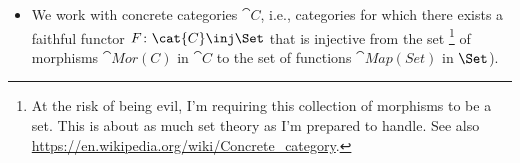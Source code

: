 \documentclass[onesided]{ccg-pset}
\author{Colton Grainger}
\date{\today}
\begin{document}
\maketitle

\begin{note}
    \label{conventions}
    \hfill
    \begin{itemize}
        \item We work with concrete categories $\cat{C}$, i.e., categories for which there exists a faithful functor $F \colon \cat{C} \inj \Set$ that is injective from the set%
            \footnote{%
                At the risk of being evil, I'm requiring this collection of morphisms to be a set. This is about as much set theory as I'm prepared to handle. See also \url{https://en.wikipedia.org/wiki/Concrete_category}.
            }
            of morphisms $\cat{Mor(C)}$ in $\cat{C}$ to the set of functions $\cat{Map(Set)}$ in $\Set$).
    \end{itemize}
\end{note}
\end{document}
